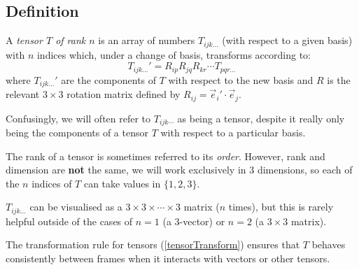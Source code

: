\documentclass[../main.tex]{subfiles}
\begin{document}
\subsection{Definition}
\begin{definition}
  A \textit{tensor $T$ of rank $n$} is an array of numbers $T_{ijk\ldots}$ (with respect to a given basis) with $n$ indices which, under a change of basis, transforms according to:
  \begin{equation}
    T_{ijk\ldots}' = R_{i p}R_{j q}R_{k r} \cdots T_{p q r\ldots} \label{tensorTransform}
  \end{equation}
  where $T_{ijk\ldots}'$ are the components of $T$ with respect to the new basis and $R$ is the relevant $3\times 3$ rotation matrix defined by $R_{i j} = \vec{e}_i' \cdot \vec{e}_j$.
\end{definition}
Confusingly, we will often refer to $T_{ijk\cdots}$ as being a tensor, despite it really only being the components of a tensor $T$ with respect to a particular basis.
\begin{remark}
  The rank of a tensor is sometimes referred to its \textit{order}.
  However, rank and dimension are \textbf{not} the same, we will work exclusively in 3 dimensions, so each of the $n$ indices of $T$ can take values in $\{1, 2, 3\}$.
\end{remark}
\begin{remark}
  $T_{ijk\ldots}$ can be visualised as a $3 \times 3 \times \cdots \times 3$ matrix ($n$ times), but this is rarely helpful outside of the cases of $n = 1$ (a 3-vector) or $n = 2$ (a $3\times 3$ matrix).
\end{remark}
The transformation rule for tensors (\cref{tensorTransform}) ensures that $T$ behaves consistently between frames when it interacts with vectors or other tensors.
\end{document}
